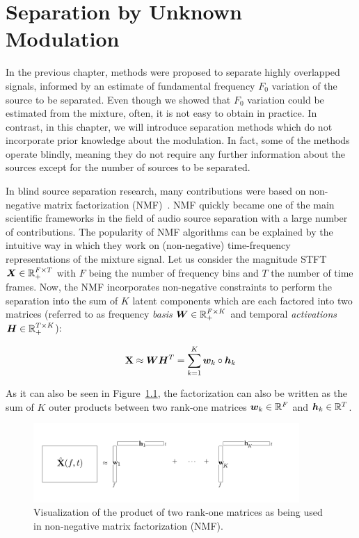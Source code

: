 \chapter{Separation by Unknown Modulation}
\label{cha:unknown}

In the previous chapter, methods were proposed to separate highly overlapped signals, informed by an estimate of fundamental frequency \(F_0\) variation of the source to be separated.
Even though we showed that \(F_0\)  variation could be estimated from the mixture, often, it is not easy to obtain in practice.
In contrast, in this chapter, we will introduce separation methods which do not incorporate prior knowledge about the modulation. 
In fact, some of the methods operate blindly, meaning they do not require any further information about the sources except for the number of sources to be separated.
\par
In blind source separation research, many contributions were based on non-negative matrix factorization (NMF)~\cite{lee99, lee01}.
NMF quickly became one of the main scientific frameworks in the field of audio source separation with a large number of contributions.
The popularity of NMF algorithms can be explained by the intuitive way in which they work on (non-negative) time-frequency representations of the mixture signal.
Let us consider the magnitude STFT \({\bm{X}} \in {\mathbb{R}}_{+}^{F \times T}\) with \(F\) being the number of frequency bins and \(T\) the number of time frames.
Now, the NMF incorporates non-negative constraints to perform the separation into the sum of \(K\) latent components which are each factored into two matrices (referred to as frequency \emph{basis} \({\bm{W}} \in {\mathbb{R}}_{+}^ { F \times K }\) and temporal \emph{activations} \({\bm{H}} \in {\mathbb{R}}_{+}^ { T \times K }\)):

\begin{equation}
   \mathbf{X} \approx {\bm{W}} {\bm{H}}^{T} = \sum\limits_{k=1}^{K} {\bm{w}}_{k} \circ {\bm{h}}_{k}
   \label{eq:vanilla_nmf}
\end{equation}

As it can also be seen in Figure~\ref{fig:nmf}, the factorization can also be
written as the sum of \(K\) outer products between two rank-one matrices \({\bm{w}}_k \in {\mathbb{R}}^F\)
and \({\bm{h}}_k \in {\mathbb{R}}^T\).

\begin{figure}[ht]
  \centering
  \includegraphics[width=0.9\textwidth]{Chapters/06_Separation_Unknown/figures/nmf.pdf}
  \caption{Visualization of the product of two rank-one matrices as being used in non-negative matrix factorization (NMF).}
  \label{fig:nmf}
\end{figure}


